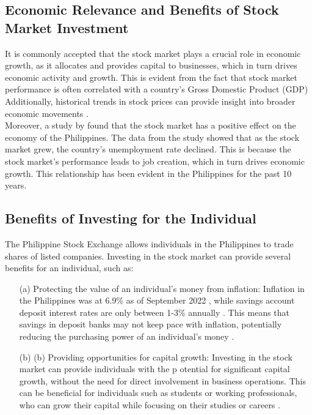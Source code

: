 \subsection{Economic Relevance and Benefits of Stock Market Investment}
It is commonly accepted that the stock market plays a crucial role in economic growth,
 as it allocates and provides capital to businesses, which in turn drives economic
  activity and growth. This is evident from the fact that stock market performance
   is often correlated with a country's Gross Domestic Product (GDP)  
  \cite{TradeBrains, Hall2022, Bae2017}
  Additionally, historical trends in stock prices can provide insight into 
  broader economic movements 
\cite{Campbell2021}.
\\Moreover, a study by  found that the stock market has a 
positive effect on the economy of the Philippines. The data from the study 
showed that as the stock market grew, the country's unemployment rate declined. 
This is because the stock market's performance leads to job creation, which in 
turn drives economic growth. This relationship has been evident in the Philippines 
for the past 10 years.

\subsection{Benefits of Investing for the Individual}
The Philippine Stock Exchange allows individuals in the Philippines
 to trade shares of listed companies. Investing in the stock market can provide 
 several benefits for an individual, such as:
\begin{itemize}
    \item[(a)] Protecting the value of an individual's money from inflation: Inflation 
    in the Philippines was at 6.9\% as of September 2022 
    \cite{tradingEconomics}, 
    while savings account deposit interest rates are only between 1-3\% annually 
    \cite{BSP19}. 
    This means that savings in deposit banks may not keep pace with inflation, 
    potentially reducing the purchasing power of an individual's money 
    \cite{RBC, EdwardJones}.
    \item[(b)] (b)	Providing opportunities for capital growth: 
    Investing in the stock market can provide individuals with the p
    otential for significant capital growth, without the need for direct 
    involvement in business operations. This can be beneficial for individuals
    such as students or working professionals, who can grow their capital while 
    focusing on their studies or careers
    \cite{USSecAndExComm}.
\end{itemize}


